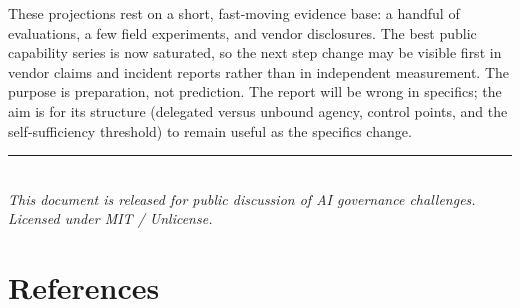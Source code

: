 \documentclass[11pt,letterpaper]{article}
\begin{document}
These projections rest on a short, fast-moving evidence base: a handful of evaluations, a few field experiments, and vendor disclosures. The best public capability series is now saturated, so the next step change may be visible first in vendor claims and incident reports rather than in independent measurement. The purpose is preparation, not prediction. The report will be wrong in specifics; the aim is for its structure (delegated versus unbound agency, control points, and the self-sufficiency threshold) to remain useful as the specifics change.

\vspace{0.5cm}
\begin{center}
\textcolor{softslate}{\rule{6cm}{0.5pt}}\\[0.5cm]
\textit{This document is released for public discussion of AI governance challenges.}\\[0.3cm]
\textit{Licensed under MIT / Unlicense.}
\end{center}

\clearpage
\section*{References}

\small
\end{document}
